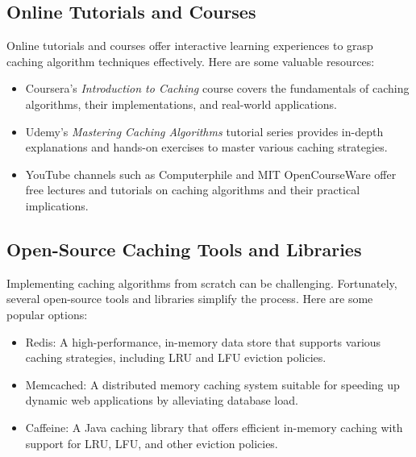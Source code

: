 \documentclass[12pt]{book} %
\begin{document}
\subsection{Online Tutorials and Courses}
Online tutorials and courses offer interactive learning experiences to grasp caching algorithm techniques effectively. Here are some valuable resources:
\begin{itemize}
    \item Coursera's \textit{Introduction to Caching} course covers the fundamentals of caching algorithms, their implementations, and real-world applications.
    \item Udemy's \textit{Mastering Caching Algorithms} tutorial series provides in-depth explanations and hands-on exercises to master various caching strategies.
    \item YouTube channels such as Computerphile and MIT OpenCourseWare offer free lectures and tutorials on caching algorithms and their practical implications.
\end{itemize}

\subsection{Open-Source Caching Tools and Libraries}
Implementing caching algorithms from scratch can be challenging. Fortunately, several open-source tools and libraries simplify the process. Here are some popular options:
\begin{itemize}
    \item Redis: A high-performance, in-memory data store that supports various caching strategies, including LRU and LFU eviction policies.
    \item Memcached: A distributed memory caching system suitable for speeding up dynamic web applications by alleviating database load.
    \item Caffeine: A Java caching library that offers efficient in-memory caching with support for LRU, LFU, and other eviction policies.
\end{itemize}

\FloatBarrier
\end{document}
